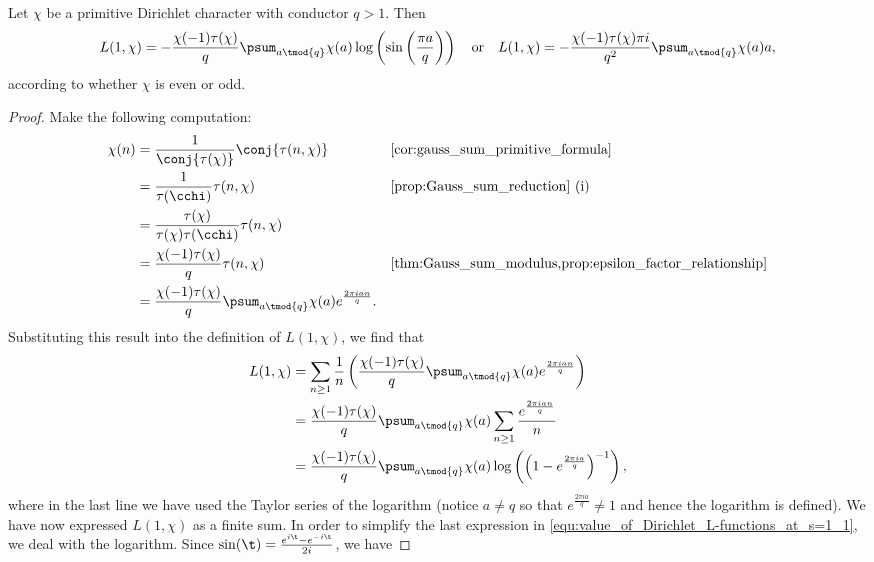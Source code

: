       \begin{theorem}\label{thm:Value_of_Dirichlet_L-functions_at_s=1}
        Let $\chi$ be a primitive Dirichlet character with conductor $q > 1$. Then
        \[
          L(1,\chi) = -\frac{\chi(-1)\tau(\chi)}{q}\psum_{a \tmod{q}}\chi(a)\log\left(\sin\left(\frac{\pi a}{q}\right)\right) \quad \text{or} \quad L(1,\chi) = -\frac{\chi(-1)\tau(\chi)\pi i}{q^{2}}\psum_{a \tmod{q}}\chi(a)a,
        \]
        according to whether $\chi$ is even or odd.
      \end{theorem}
      \begin{proof}
        Make the following computation:
        \begin{align*}
          \chi(n) &= \frac{1}{\conj{\tau(\chi)}}\conj{\tau(n,\chi)} && \text{\cref{cor:gauss_sum_primitive_formula}} \\
          &= \frac{1}{\tau(\cchi)}\tau(n,\chi) && \text{\cref{prop:Gauss_sum_reduction} (i)} \\
          &= \frac{\tau(\chi)}{\tau(\chi)\tau(\cchi)}\tau(n,\chi) \\
          &= \frac{\chi(-1)\tau(\chi)}{q}\tau(n,\chi) && \text{\cref{thm:Gauss_sum_modulus,prop:epsilon_factor_relationship}} \\
          &= \frac{\chi(-1)\tau(\chi)}{q}\psum_{a \tmod{q}}\chi(a)e^{\frac{2\pi ian}{q}}.
        \end{align*}
        Substituting this result into the definition of $L(1,\chi)$, we find that
        \begin{equation}\label{equ:value_of_Dirichlet_L-functions_at_s=1_1}
          \begin{aligned}
            L(1,\chi) &= \sum_{n \ge 1}\frac{1}{n}\left(\frac{\chi(-1)\tau(\chi)}{q}\psum_{a \tmod{q}}\chi(a)e^{\frac{2\pi ian}{q}}\right) \\
            &= \frac{\chi(-1)\tau(\chi)}{q}\psum_{a \tmod{q}}\chi(a)\sum_{n \ge 1}\frac{e^{\frac{2\pi ian}{q}}}{n} \\
            &= \frac{\chi(-1)\tau(\chi)}{q}\psum_{a \tmod{q}}\chi(a)\log\left(\left(1-e^{\frac{2\pi ia}{q}}\right)^{-1}\right),
          \end{aligned}
        \end{equation}
        where in the last line we have used the Taylor series of the logarithm (notice $a \neq q$ so that $e^{\frac{2\pi ia}{q}} \neq 1$ and hence the logarithm is defined). We have now expressed $L(1,\chi)$ as a finite sum. In order to simplify the last expression in \cref{equ:value_of_Dirichlet_L-functions_at_s=1_1}, we deal with the logarithm. Since $\sin(\t) = \frac{e^{i\t}-e^{-i\t}}{2i}$, we have

\end{proof}
